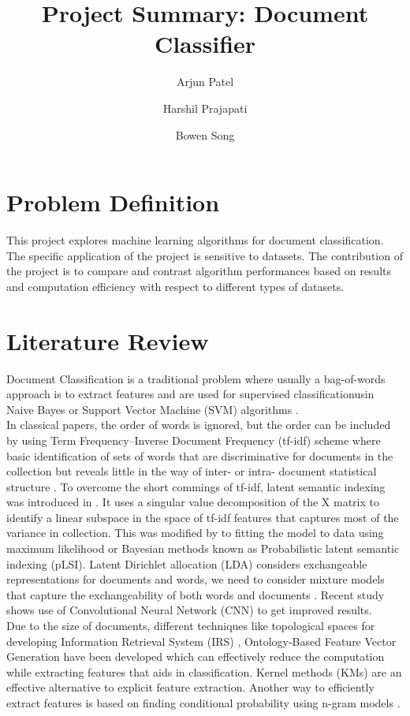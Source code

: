\documentclass[a4paper, 11pt]{article}
\title{Project Summary: Document Classifier}
\author[1]{Arjun Patel}
\author[1]{Harshil Prajapati}
\author[1]{Bowen Song}
\affil[1]{Department of Electrical and Computer Engineering, Boston University}
\begin{document}
\maketitle
\section{Problem Definition}
This project explores machine learning algorithms for document classification. The specific application of the project is sensitive to datasets. The contribution of the project is to compare and contrast algorithm performances based on results and computation efficiency with respect to different types of datasets.

\section{Literature Review}
 Document Classification is a traditional problem where usually a bag-of-words approach is to extract features and are used for supervised classificationusin Naive Bayes or Support Vector Machine (SVM) algorithms \cite{sachan2018investigating}. \\

In classical papers, the order of words is ignored, but the order can be included by using Term Frequency–Inverse Document Frequency (tf-idf) scheme where basic identification of sets of words that are discriminative for documents in the collection but reveals little in the way of inter- or intra- document statistical structure \cite{maes1995agents}. To overcome the short commings of tf-idf, latent semantic indexing was introduced in \cite{deerwester1990indexing}. It uses a singular value decomposition of the X matrix to identify a linear subspace in the space of tf-idf features that captures most of the variance in collection. This was modified by \cite{hofmann1999probabilistic} to fitting the model to data using maximum likelihood or Bayesian methods known as Probabilistic latent semantic indexing (pLSI). Latent Dirichlet allocation (LDA) considers exchangeable representations for documents and words, we need to consider mixture models that capture the exchangeability of both words and documents \cite{blei2003latent}. Recent study shows use of Convolutional Neural Network (CNN) \cite{kim2014convolutional} to get improved results. \\

Due to the size of documents, different techniques like topological spaces for developing Information Retrieval System (IRS) \cite{parlak2018feature},  Ontology-Based Feature Vector Generation \cite{elhadad2018novel} have been developed which can effectively reduce the computation while extracting features that aids in classification. Kernel methods (KMs) are an effective alternative to explicit feature extraction. Another way to efficiently extract features is based on finding conditional probability using n-gram models \cite{furnkranz1998study} .\\
\end{document}

